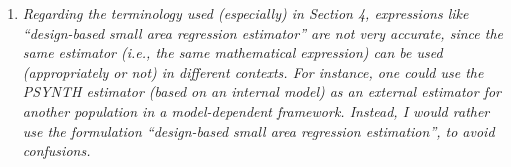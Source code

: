\documentclass{article}
\begin{document}
\begin{enumerate}
%    	
    
    
    \item \textit{Regarding the terminology used (especially) in Section 4, expressions like “design-based small area regression estimator” are not very accurate, since the same estimator (i.e., the same mathematical expression) can be used (appropriately or not) in different contexts. For instance, one could use the PSYNTH estimator (based on an internal model) as an external estimator for another population in a	model-dependent framework. Instead, I would rather use the formulation “design-based small area regression estimation”, to avoid confusions.}
    

\end{enumerate}
\end{document}
